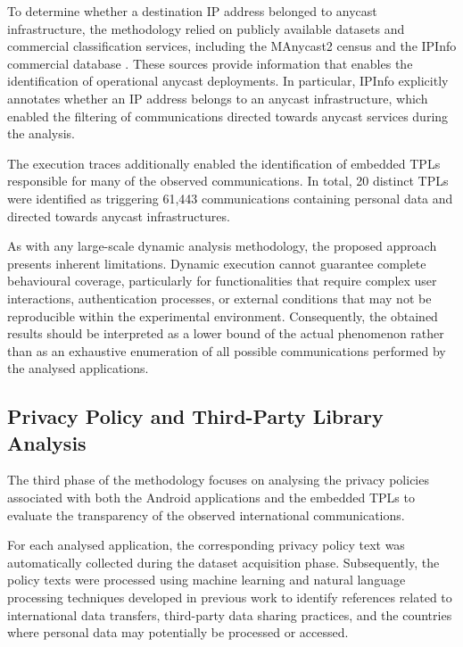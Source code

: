 To determine whether a destination IP address belonged to anycast infrastructure, the methodology relied on publicly available datasets and commercial classification services, including the MAnycast2 census \cite{Sommese2020MAnycast2:Anycast} and the IPInfo commercial database \cite{IPIPinfo}. These sources provide information that enables the identification of operational anycast deployments. In particular, IPInfo explicitly annotates whether an IP address belongs to an anycast infrastructure, which enabled the filtering of communications directed towards anycast services during the analysis.

The execution traces additionally enabled the identification of embedded TPLs responsible for many of the observed communications. In total, 20 distinct TPLs were identified as triggering 61,443 communications containing personal data and directed towards anycast infrastructures.

As with any large-scale dynamic analysis methodology, the proposed approach presents inherent limitations. Dynamic execution cannot guarantee complete behavioural coverage, particularly for functionalities that require complex user interactions, authentication processes, or external conditions that may not be reproducible within the experimental environment. Consequently, the obtained results should be interpreted as a lower bound of the actual phenomenon rather than as an exhaustive enumeration of all possible communications performed by the analysed applications.

\subsection{Privacy Policy and Third-Party Library Analysis}
\label{sc:anycast_experiments_privacy_policies}

The third phase of the methodology focuses on analysing the privacy policies associated with both the Android applications and the embedded TPLs to evaluate the transparency of the observed international communications.

For each analysed application, the corresponding privacy policy text was automatically collected during the dataset acquisition phase. Subsequently, the policy texts were processed using machine learning and natural language processing techniques developed in previous work \cite{Guaman2023AutomatedApplications} to identify references related to international data transfers, third-party data sharing practices, and the countries where personal data may potentially be processed or accessed.

